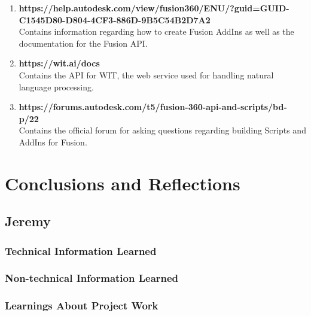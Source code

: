 \documentclass[onecolumn, draftclsnofoot,10pt, compsoc]{IEEEtran}
\begin{document}
	\begin{enumerate}
		\item \textbf{https://help.autodesk.com/view/fusion360/ENU/?guid=GUID-C1545D80-D804-4CF3-886D-9B5C54B2D7A2} \\
			Contains information regarding how to create Fusion AddIns as well as the documentation for the Fusion API.
		\item \textbf{https://wit.ai/docs} \\
			Contains the API for WIT, the web service used for handling natural language processing.
		\item \textbf{https://forums.autodesk.com/t5/fusion-360-api-and-scripts/bd-p/22} \\
			Contains the official forum for asking questions regarding building Scripts and AddIns for Fusion.
	\end{enumerate}









\section{Conclusions and Reflections}


\subsection{Jeremy}
	\subsubsection{Technical Information Learned}
	
	
	
	\subsubsection{Non-technical Information Learned}
	
	


	\subsubsection{Learnings About Project Work}
	
\end{document}
